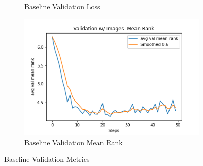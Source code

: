 \begin{figure}[ht!]
\begin{subfigure}[b]{0.3\textwidth}
         \caption{Baseline Validation Loss}
         \label{fig:baseline_loss}
     \end{subfigure}
     \hfill
     \begin{subfigure}[b]{0.3\textwidth}
         \centering
         \includegraphics[width=\textwidth]{./figure/results/baseline_and_blindfolding/images/avg val mean rank.png}
         \caption{Baseline Validation Mean Rank}
         \label{fig:baseline_mean_rank}
     \end{subfigure}
     \caption{Baseline Validation Metrics}
     \label{fig:baseline_metrics}
\end{figure}


